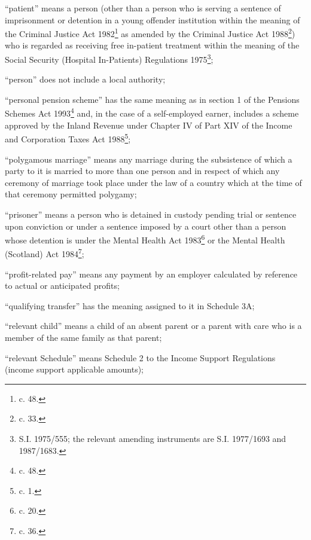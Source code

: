 \documentclass[12pt,a4paper]{article}
\begin{document}
\begin{enumerate}
“patient” means a person (other than a person who is serving a sentence of imprisonment or detention in a young offender institution within the meaning of the Criminal Justice Act 1982\footnote{ c. 48.} as amended by the Criminal Justice Act 1988\footnote{ c. 33.}) who is regarded as receiving free in-patient treatment within the meaning of the Social Security (Hospital In-Patients) Regulations 1975\footnote{\frenchspacing S.I. 1975/555; the relevant amending instruments are S.I. 1977/1693 and 1987/1683.};

“person” does not include a local authority;

“personal pension scheme” has the same meaning as in 
section 1 of the Pensions Schemes Act 1993\footnote{ c. 48.}  %
and, in the case of a self-employed earner, includes a scheme approved by the Inland Revenue under Chapter IV of Part XIV of the Income and Corporation Taxes Act 1988\footnote{ c. 1.};

“polygamous marriage” means any marriage during the subsistence of which a party to it is married to more than one person and in respect of which any ceremony of marriage took place under the law of a country which at the time of that ceremony permitted polygamy;

“prisoner” means a person who is detained in custody pending trial or sentence upon conviction or under a sentence imposed by a court other than a person whose detention is under the Mental Health Act 1983\footnote{ c. 20.} or the Mental Health (Scotland) Act 1984\footnote{ c. 36.};

“profit-related pay” means any payment by an employer calculated by reference to actual or anticipated profits;

“qualifying transfer” has the meaning assigned to it in Schedule 3A;

“relevant child” means a child of an absent parent or a parent with care who is a member of the same family as that parent;

“relevant Schedule” means Schedule 2 to the Income Support Regulations (income support applicable amounts);


\end{enumerate}
\end{document}
